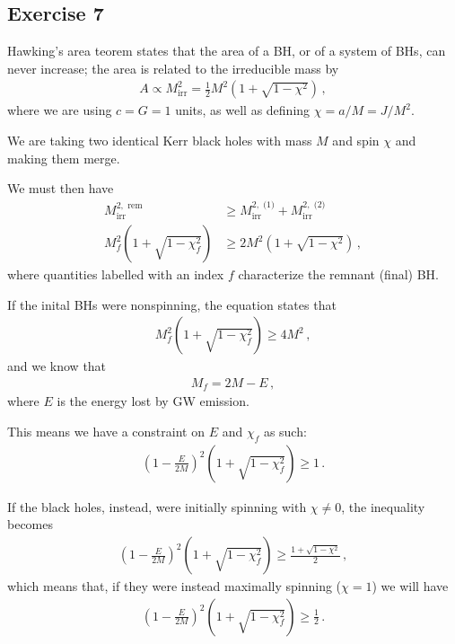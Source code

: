\documentclass[main.tex]{subfiles}
\begin{document}
\subsection{Exercise 7}

Hawking's area teorem states that the area of a BH, or of a system of BHs, can never increase; the area is related to the irreducible mass by 
%
\begin{align}
A \propto M _{\text{irr}}^2 = \frac{1}{2} M^2\left(1 + \sqrt{1 - \chi^2}\right)
\,,
\end{align}
%
where we are using \(c = G = 1\) units, as well as defining \(\chi = a / M = J / M^2\).  

We are taking two identical Kerr black holes with mass \(M\) and spin \(\chi\) and making them merge. 

We must then have %
\begin{align}
M_{\text{irr}}^{2, \text{ rem}} &\geq 
M^{2, \text{ (1)}} _{\text{irr}}  +
M^{2, \text{ (2)}} _{\text{irr}}  
\\
M_f^2 \left( 1+ \sqrt{1 - \chi _f^2}\right) &\geq 2 M^2\left(1 + \sqrt{1 - \chi^2}\right)
\,,
\end{align}
%
where quantities labelled with an index \(f\) characterize the remnant  (final) BH. 

If the inital BHs were nonspinning, the equation states that %
\begin{align}
M_f^2 \left(1 + \sqrt{1 - \chi _f^2}\right) \geq 4 M^2
\,,
\end{align}
%
and we know that %
\begin{align}
M_f = 2M - E
\,,
\end{align}
%
where \(E\) is the energy lost by GW emission. 

This means we have a constraint on \(E\) and \(\chi _f\) as such: %
\begin{align}
\left(1 - \frac{E}{2M}\right)^2 \left(1 + \sqrt{1 - \chi _f^2}\right) \geq 1
\,.
\end{align}

If the black holes, instead, were initially spinning with \(\chi \neq 0\), the inequality becomes %
\begin{align}
\left(1 - \frac{E}{2M}\right)^2 \left(1 + \sqrt{1 - \chi _f^2}\right) \geq \frac{1 + \sqrt{1 - \chi^2}}{2}
\,,
\end{align}
%
which means that, if they were instead maximally spinning (\(\chi = 1\)) we will have 
%
\begin{align}
\left(1 - \frac{E}{2M}\right)^2 \left(1 + \sqrt{1 - \chi _f^2}\right) \geq \frac{1}{2}
\,.
\end{align}
\end{document}
